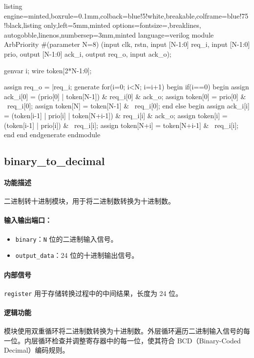 \documentclass[a4paper]{article}
\begin{document}
\begin{tcblisting}{listing engine=minted,boxrule=0.1mm,colback=blue!5!white,breakable,colframe=blue!75!black,listing only,left=5mm,minted options={fontsize=\small,breaklines, autogobble,linenos,numbersep=3mm},minted language=verilog}
module ArbPriority
    #(parameter N=8)
     (input clk, rstn,
     input [N-1:0] req_i,
     input [N-1:0] prio,
     output [N-1:0] ack_i,
     output req_o,
     input ack_o);

    genvar i;
    wire token[2*N-1:0];


    assign req_o = |req_i;
    generate for(i=0; i<N; i=i+1) begin
      if(i==0) begin
        assign ack_i[0] = (prio[0] | token[N-1]) & req_i[0] & ack_o;
        assign token[0] = prio[0] & ~req_i[0];
        assign token[N] = token[N-1] & ~req_i[0];
      end else begin
        assign ack_i[i] = (token[i-1] | prio[i] | token[N+i-1]) & req_i[i] & ack_o;
        assign token[i] = (token[i-1] | prio[i]) & ~req_i[i];
        assign token[N+i] = token[N+i-1] & ~req_i[i];
      end
    end endgenerate
endmodule
\end{tcblisting}

\subsection{binary\_to\_decimal}
\paragraph{功能描述} 二进制转十进制模块，用于将二进制数转换为十进制数。

\paragraph{输入输出端口：}
\begin{itemize}
    \item \texttt{binary}：\texttt{N} 位的二进制输入信号。
    \item \texttt{output\_data}：24 位的十进制输出信号。
\end{itemize}

\paragraph{内部信号} \texttt{register} 用于存储转换过程中的中间结果，长度为 24 位。

\paragraph{逻辑功能}
模块使用双重循环将二进制数转换为十进制数。外层循环遍历二进制输入信号的每一位。内层循环检查并调整寄存器中的每一位，使其符合 BCD（Binary-Coded Decimal）编码规则。
\end{document}
